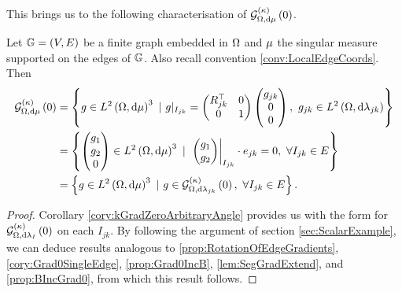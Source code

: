 This brings us to the following characterisation of $\mathcal{G}_{ \Omega, \mathrm{d}\mu}^{(\kappa)}\left( 0 \right)$.
\begin{cory} \label{cory:CharacterisationkGradientsZero}
	Let $\mathbb{G}=\left( V,E \right)$ be a finite graph embedded in $\Omega$ and $\mu$ the singular measure supported on the edges of $\mathbb{G}$.
	Also recall convention \ref{conv:LocalEdgeCoords}.
	Then
	\begin{align*}
		\kgradZero{\ddom}{\ddmes} &= 
		\clbracs{ 
		g\in\ltwo{\ddom}{\ddmes}^3 \ \vert \
		g\vert_{I_{jk}} = \begin{pmatrix} R_{jk}^{\top} & 0 \\ 0 & 1 \end{pmatrix} \begin{pmatrix} g_{jk} \\ 0 \\ 0 \end{pmatrix}, \ g_{jk}\in\ltwo{\ddom}{\lambda_{jk}}
		} \\
		&=
		\clbracs{ 
		\begin{pmatrix} g_1 \\ g_2 \\ 0 \end{pmatrix}		
		\in\ltwo{\ddom}{\ddmes}^3 \ \vert \ \left.
		\begin{pmatrix} g_1 \\ g_2 \end{pmatrix}
		\right\rvert_{I_{jk}}\cdot e_{jk} = 0, \ \forall I_{jk}\in E 
		} \\
		&= \clbracs{ g\in\ltwo{\ddom}{\ddmes}^3 \ \vert \ g\in\kgradZero{\ddom}{\lambda_{jk}}, \ \forall I_{jk}\in E }.
	\end{align*}
\end{cory}
\begin{proof}
	Corollary \ref{cory:kGradZeroArbitraryAngle} provides us with the form for $\mathcal{G}_{ \Omega, \mathrm{d}\lambda_I}^{(\kappa)}\left( 0 \right)$ on each $I_{jk}$.
	By following the argument of section \ref{sec:ScalarExample}, we can deduce results analogous to \ref{prop:RotationOfEdgeGradients}, \ref{cory:Grad0SingleEdge}, \ref{prop:Grad0IncB}, \ref{lem:SegGradExtend}, and \ref{prop:BIncGrad0}, from which this result follows.
\end{proof}

